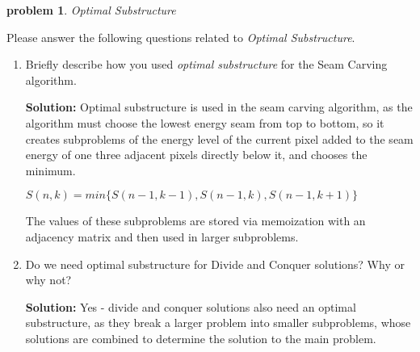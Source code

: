 \documentclass[10pt]{article}
\newcommand{\solution}[1]{\color{blue}\hfill\break\noindent\textbf{Solution:} #1\color{black}}
\newtheorem{problem}{\sc\color{cit}problem}
\begin{document}
\begin{problem}Optimal Substructure\end{problem}
Please answer the following questions related to \emph{Optimal Substructure}.
\begin{enumerate}
    \item Briefly describe how you used \emph{optimal substructure} for the Seam Carving algorithm.
    
    \solution{
    Optimal substructure is used in the seam carving algorithm, as the algorithm must choose the lowest energy seam from top to bottom, so it creates subproblems of the energy level of the current pixel added to the seam energy of one three adjacent pixels directly below it, and chooses the minimum. 
    
    $S(n, k) = min\{S(n-1, k-1), S(n-1, k), S(n-1, k+1)\}$ 
    
    The values of these subproblems are stored via memoization with an adjacency matrix and then used in larger subproblems.
    }
    \item Do we need optimal substructure for Divide and Conquer solutions?  Why or why not?
    
    \solution{
    Yes - divide and conquer solutions also need an optimal substructure, as they break a larger problem into smaller subproblems, whose solutions are combined to determine the solution to the main problem.
    }
\end{enumerate}
\end{document}
